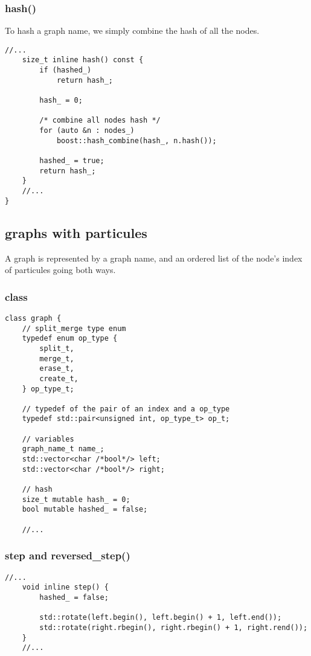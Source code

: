 \documentclass[11pt]{article}
\begin{document}
\subsubsection{hash()}

To hash a graph name, we simply combine the hash of all the nodes.

\begin{lstlisting}[style=CStyle]
	//...
	size_t inline hash() const {
		if (hashed_)
			return hash_;

		hash_ = 0;

		/* combine all nodes hash */
		for (auto &n : nodes_)
			boost::hash_combine(hash_, n.hash());

		hashed_ = true;
		return hash_;
	}
	//...
}
\end{lstlisting}

\subsection{graphs with particules}

A graph is represented by a graph name, and an ordered list of the node's index of particules going both ways.

\subsubsection{class}

\begin{lstlisting}[style=CStyle]
class graph {
	// split_merge type enum 
  	typedef enum op_type {
		split_t,
		merge_t,
		erase_t,
		create_t,
	} op_type_t;

	// typedef of the pair of an index and a op_type 
  	typedef std::pair<unsigned int, op_type_t> op_t;
  	
	// variables 
	graph_name_t name_;
	std::vector<char /*bool*/> left;
	std::vector<char /*bool*/> right;

	// hash
	size_t mutable hash_ = 0;
	bool mutable hashed_ = false;

	//...
\end{lstlisting}

\subsubsection{step and reversed\_step()}

\begin{lstlisting}[style=CStyle]
	//...
	void inline step() {
  		hashed_ = false;

  		std::rotate(left.begin(), left.begin() + 1, left.end());
		std::rotate(right.rbegin(), right.rbegin() + 1, right.rend());
  	}
  	//...
\end{lstlisting}
\end{document}
